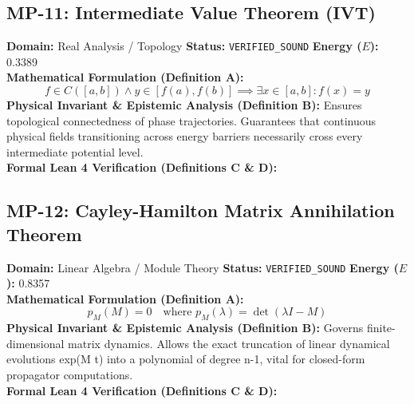 \subsection{MP-11: Intermediate Value Theorem (IVT)}
\textbf{Domain:} Real Analysis / Topology \hfill \textbf{Status:} \texttt{VERIFIED\_SOUND} \hfill \textbf{Energy ($E$):} 0.3389\\
\textbf{Mathematical Formulation (Definition A):}
\begin{equation*}
f \in C([a, b]) \wedge y \in [f(a), f(b)] \implies \exists x \in [a, b]: f(x) = y
\end{equation*}
\textbf{Physical Invariant \& Epistemic Analysis (Definition B):}
Ensures topological connectedness of phase trajectories. Guarantees that continuous physical fields transitioning across energy barriers necessarily cross every intermediate potential level.\\

\textbf{Formal Lean 4 Verification (Definitions C \& D):}


\vspace{1em}
\subsection{MP-12: Cayley-Hamilton Matrix Annihilation Theorem}
\textbf{Domain:} Linear Algebra / Module Theory \hfill \textbf{Status:} \texttt{VERIFIED\_SOUND} \hfill \textbf{Energy ($E$):} 0.8357\\
\textbf{Mathematical Formulation (Definition A):}
\begin{equation*}
p_M(M) = 0 \quad \text{where } p_M(\lambda) = \det(\lambda I - M)
\end{equation*}
\textbf{Physical Invariant \& Epistemic Analysis (Definition B):}
Governs finite-dimensional matrix dynamics. Allows the exact truncation of linear dynamical evolutions exp(M t) into a polynomial of degree n-1, vital for closed-form propagator computations.\\

\textbf{Formal Lean 4 Verification (Definitions C \& D):}


\vspace{1em}

